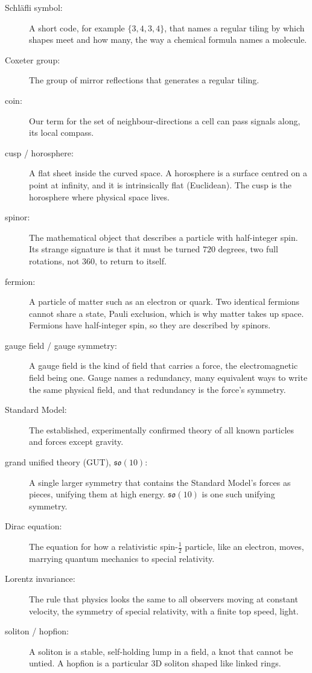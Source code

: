 \begin{description}
  \item[Schl\"afli symbol:] A short code, for example $\{3,4,3,4\}$, that names a regular tiling by which shapes
  meet and how many, the way a chemical formula names a molecule.
  \item[Coxeter group:] The group of mirror reflections that generates a regular tiling.
  \item[coin:] Our term for the set of neighbour-directions a cell can pass signals along, its local compass.
  \item[cusp / horosphere:] A flat sheet inside the curved space. A horosphere is a surface centred on a point at
  infinity, and it is intrinsically flat (Euclidean). The cusp is the horosphere where physical space lives.
  \item[spinor:] The mathematical object that describes a particle with half-integer spin. Its strange signature is
  that it must be turned $720$ degrees, two full rotations, not $360$, to return to itself.
  \item[fermion:] A particle of matter such as an electron or quark. Two identical fermions cannot share a state,
  Pauli exclusion, which is why matter takes up space. Fermions have half-integer spin, so they are described by
  spinors.
  \item[gauge field / gauge symmetry:] A gauge field is the kind of field that carries a force, the electromagnetic
  field being one. Gauge names a redundancy, many equivalent ways to write the same physical field, and that
  redundancy is the force's symmetry.
  \item[Standard Model:] The established, experimentally confirmed theory of all known particles and forces except
  gravity.
  \item[grand unified theory (GUT), $\mathfrak{so}(10)$:] A single larger symmetry that contains the Standard
  Model's forces as pieces, unifying them at high energy. $\mathfrak{so}(10)$ is one such unifying symmetry.
  \item[Dirac equation:] The equation for how a relativistic spin-$\tfrac{1}{2}$ particle, like an electron, moves,
  marrying quantum mechanics to special relativity.
  \item[Lorentz invariance:] The rule that physics looks the same to all observers moving at constant velocity, the
  symmetry of special relativity, with a finite top speed, light.
  \item[soliton / hopfion:] A soliton is a stable, self-holding lump in a field, a knot that cannot be untied. A
  hopfion is a particular 3D soliton shaped like linked rings.

\end{description}
